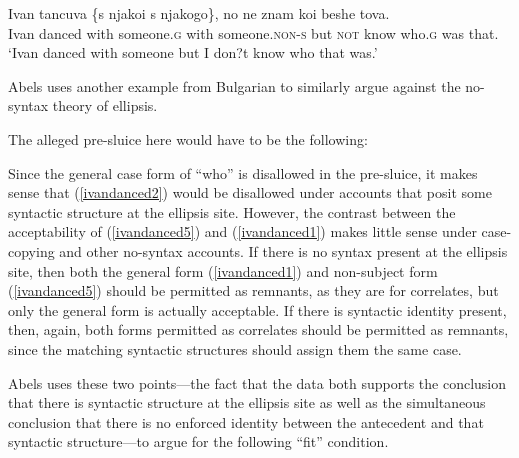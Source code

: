\documentclass{turabian-researchpaper}
\begin{document}
\begin{exe}
\ex\label{ivandanced3}
\gll Ivan tancuva \{s njakoi \textbar s njakogo\}, no ne znam koi beshe tova. 
 \\ Ivan danced with someone.\textsc{g} with someone.\textsc{non-s} but \textsc{not} know who.\textsc{g} was that. \\
 \trans `Ivan danced with someone but I don?t know who that was.'
\end{exe}

Abels uses another example from Bulgarian to similarly argue against the no-syntax theory of ellipsis. 

\begin{exe}
\end{exe}

\noindent The alleged pre-sluice here would have to be the following: 

\begin{exe}
\end{exe}

Since the general case form of ``who'' is disallowed in the pre-sluice, it makes sense that (\ref{ivandanced2}) would be disallowed under accounts that posit some syntactic structure at the ellipsis site. However, the contrast between the acceptability of (\ref{ivandanced5}) and (\ref{ivandanced1}) makes little sense under case-copying and other no-syntax accounts. If there is no syntax present at the ellipsis site, then both the general form (\ref{ivandanced1}) and non-subject form (\ref{ivandanced5}) should be permitted as remnants, as they are for correlates, but only the general form is actually acceptable. If there is syntactic identity present, then, again, both forms permitted as correlates should be permitted as remnants, since the matching syntactic structures should assign them the same case. 

Abels uses these two points---the fact that the data both supports the conclusion that there is syntactic structure at the ellipsis site as well as the simultaneous conclusion that there is no enforced identity between the antecedent and that syntactic structure---to argue for the following ``fit'' condition.  
\end{document}
